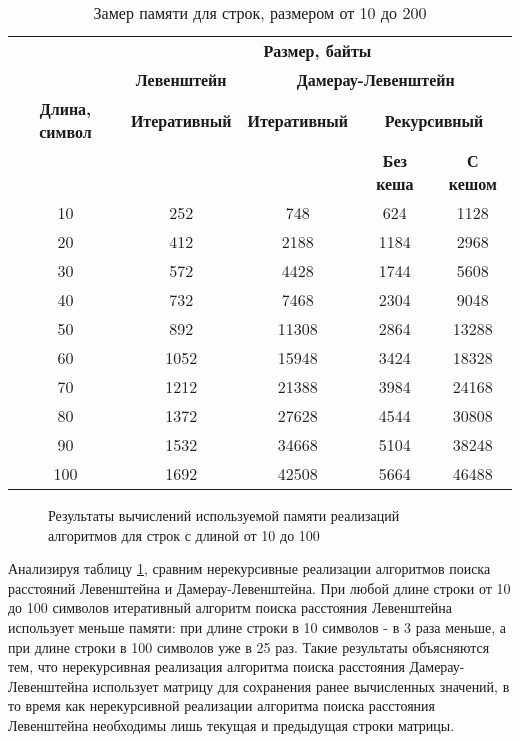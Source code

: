 \begin{table}[ht]
	\small
	\begin{center}
		\begin{threeparttable}
			\caption{Замер памяти для строк, размером от 10 до 200}
			\label{tbl:memory}
			\begin{tabular}{|c|c|c|c|c|}
				\hline
				& \multicolumn{4}{c|}{\bfseries Размер, байты} \\ \cline{2-5}
				& \multicolumn{1}{c|}{\bfseries Левенштейн}
				& \multicolumn{3}{c|}{\bfseries Дамерау-Левенштейн} \\ \cline{2-5}
				\bfseries Длина, символ & \bfseries Итеративный & \bfseries Итеративный & \multicolumn{2}{c|}{\bfseries Рекурсивный} \\ \cline{4-5}
				& & & \bfseries Без кеша & \bfseries С кешом \\
				\hline
				10 & 252 & 748 & 624 & 1128 \\
				\hline
				20 & 412 & 2188 & 1184 & 2968 \\
				\hline
				30 & 572 & 4428 & 1744 & 5608 \\
				\hline
				40 & 732 & 7468 & 2304 & 9048 \\
				\hline
				50 & 892 & 11308 & 2864 & 13288 \\
				\hline
				60 &  1052 & 15948 & 3424 & 18328 \\
				\hline
				70 & 1212 & 21388 & 3984 & 24168 \\
				\hline
				80 &1372 & 27628 & 4544 & 30808 \\
				\hline
				90 & 1532 & 34668 & 5104 &  38248 \\
				\hline
				100 & 1692 & 42508 & 5664 & 46488 \\
				\hline
			\end{tabular}	
		\end{threeparttable}
	\end{center}
\end{table}

\begin{figure}[h]
	\centering
	
	\caption{Результаты вычислений используемой памяти реализаций алгоритмов для строк с длиной от 10 до 100}
	\label{img:linear_graph_mem}
\end{figure}


\clearpage

Анализируя таблицу \ref{tbl:memory}, сравним нерекурсивные реализации алгоритмов поиска расстояний Левенштейна и Дамерау-Левенштейна. При любой длине строки от 10 до 100 символов итеративный алгоритм поиска расстояния Левенштейна использует меньше памяти: при длине строки в 10 символов - в 3 раза меньше, а при длине строки в 100 символов уже в 25 раз. Такие результаты объясняются тем, что нерекурсивная реализация алгоритма поиска расстояния Дамерау-Левенштейна использует матрицу для сохранения ранее вычисленных значений, в то время как нерекурсивной реализации алгоритма поиска расстояния Левенштейна необходимы лишь текущая и предыдущая строки матрицы.

